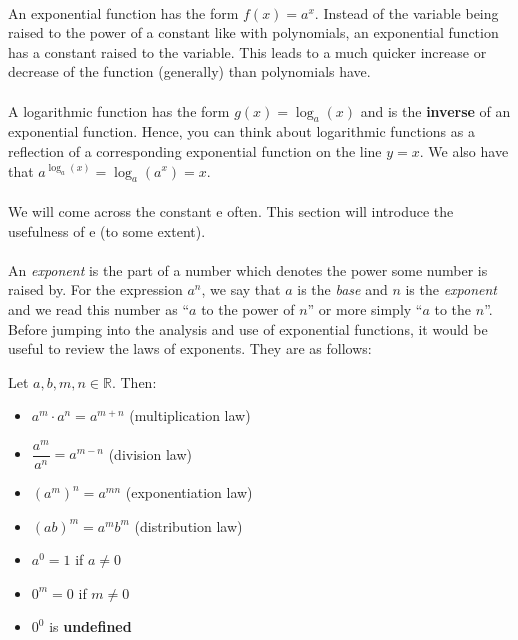 \documentclass[12pt, a4paper, titlepage, twoside]{article}
\newcommand*{\R}{\mathbb{R}}
\newcommand*{\e}{\textrm{e}}
\begin{document}
	\paragraph{}
	An exponential function has the form $f(x) = a^x$. Instead of the variable being raised to the power of a constant like with
	polynomials, an exponential function has a constant raised to the variable. This leads to a much quicker increase or decrease of
	the function (generally) than polynomials have.
	
	\paragraph{}
	A logarithmic function has the form $g(x) = \log_a(x)$ and is the \textbf{inverse} of an exponential function. Hence, you can think about 
	logarithmic functions as a reflection of a corresponding exponential function on the line $y=x$. We also have that $a^{\log_a(x)} = 
	\log_a(a^x) = x$.
	
	\paragraph{}
	We will come across the constant $\e$ often. This section will introduce the usefulness of $\e$ (to some extent).
	
	\paragraph{}
	An \textit{exponent} is the part of a number which denotes the power some number is raised by. For the expression $a^n$, we
	say that $a$ is the \textit{base} and $n$ is the \textit{exponent} and we read this number as ``$a$ to the power of $n$'' or
	more simply ``$a$ to the $n$''. Before jumping into the analysis and use of exponential functions, it would be useful to review the laws 
	of exponents. They are as follows:
	
	\begin{kp}
		Let $a, b, m, n \in \R$. Then:
		
		\begin{itemize}
			\item $a^m \cdot a^n = a^{m+n}$ (multiplication law)
			\item $\dfrac{a^m}{a^n} = a^{m-n}$ (division law)
			\item ${(a^m)}^n = a^{mn}$ (exponentiation law)
			\item $(ab)^m = a^m b^m$ (distribution law)
			\item $a^0 = 1$ if $a \neq 0$
			\item $0^m = 0$ if $m \neq 0$
			\item $0^0$ is \textbf{undefined}
		\end{itemize}
	\end{kp}
	
\end{document}
